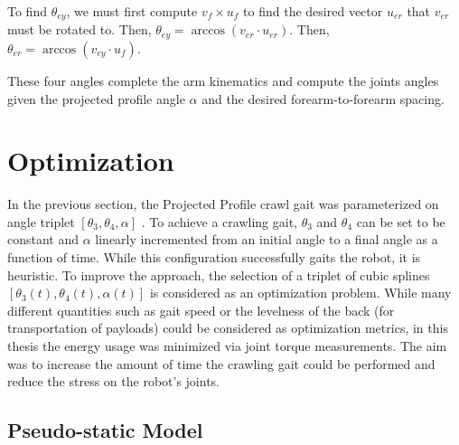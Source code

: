To find $\theta_{ey}$, we must first compute $v_f \times u_f$ to find the desired vector $u_{er}$ that
$v_{er}$ must be rotated to. Then, $\theta_{ey} = \arccos(v_{er} \cdot u_{er})$.
Then, $\theta_{er} = \arccos(v_{ey} \cdot u_f)$.

These four angles complete the arm kinematics and compute the joints angles given the projected profile angle $\alpha$
and the desired forearm-to-forearm spacing.

\section{Optimization}

In the previous section, the Projected Profile crawl gait was parameterized on angle triplet 
$[ \theta_3, \theta_4, \alpha ]$ .
To achieve a crawling gait, $\theta_3$ and $\theta_4$ can be set to be constant and $\alpha$ linearly incremented
from an initial angle to a final angle as a function of time. While this configuration successfully gaits the robot,
it is heuristic. To improve the approach, the selection of a triplet of cubic splines 
$[\theta_3(t), \theta_4(t), \alpha(t)]$ is considered as an optimization problem. 
While many different quantities such as gait speed or the levelness of the back 
(for transportation of payloads) could be considered as optimization metrics, in this thesis the energy usage was 
minimized via joint torque measurements.
The aim was to increase the amount of time the crawling gait could be performed and reduce the stress on the robot's joints.

\subsection{Pseudo-static Model}

